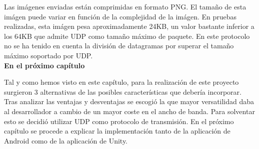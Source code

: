 Las im\'agenes enviadas est\'an comprimidas en formato PNG. El tama\~no de esta im\'agen puede variar en funci\'on de la complejidad de la im\'agen. En pruebas realizadas, esta im\'agen pesa aproximadamente 24KB, un valor bastante inferior a los 64KB que admite UDP como tama\~no m\'aximo de paquete. En este protocolo no se ha tenido en cuenta la divisi\'on de datagramas por superar el tama\~no m\'aximo soportado por UDP.\\

\bigskip
\Large{\textbf{En el pr\'oximo cap\'itulo}}\\
\normalsize


Tal y como hemos visto en este cap\'itulo, para la realizaci\'on de este proyecto surgieron 3 alternativas de las posibles caracter\'isticas que deber\'ia incorporar. Tras analizar las ventajas y desventajas se escogi\'o la que mayor versatilidad daba al desarrollador a cambio de un mayor coste en el ancho de banda. Para solventar esto se decidi\'o utilizar UDP como protocolo de transmisi\'on. En el pr\'oximo cap\'itulo se procede a explicar la implementaci\'on tanto de la aplicaci\'on de Android como de  la aplicaci\'on de Unity. 


